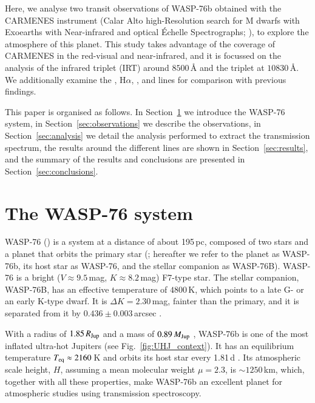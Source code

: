 \documentclass{aa}
\begin{document}
Here, we analyse two transit observations of WASP-76b obtained with the CARMENES instrument (Calar Alto high-Resolution search for M dwarfs with Exoearths with Near-infrared and optical Échelle Spectrographs; \citealt{CARMENES,CARMENES20}), to explore the atmosphere of this planet. This study takes advantage of the coverage of CARMENES in the red-visual and near-infrared, and it is focussed on the analysis of the  infrared triplet (IRT) around $8500$\,{\AA} and the  triplet at $10830$\,{\AA}. We additionally examine the , H$\alpha$, , and  lines for comparison with previous findings.

This paper is organised as follows. In Section~\ref{sec:wasp76} we introduce the WASP-76 system, in Section~\ref{sec:observations} we describe the observations, in Section~\ref{sec:analysis} we detail the analysis performed to extract the transmission spectrum, the results around the different lines are shown in Section~\ref{sec:results}, and the summary of the results and conclusions are presented in Section~\ref{sec:conclusions}.


\section{The WASP-76 system} \label{sec:wasp76}

WASP-76 () is a system at a distance of about 195\,pc, composed of two stars and a planet that orbits the primary star (\citealt{Bohn2020}; hereafter we refer to the planet as WASP-76b, its host star as WASP-76, and the stellar companion as WASP-76B). WASP-76 is a bright ($V \approx9.5$\,mag, $K \approx 8.2$\,mag) F7-type star. The stellar companion, WASP-76B, has an effective temperature of $4800$\,K, which points to a late G- or an early K-type dwarf. It is $\Delta K = 2.30$\,mag, fainter than the primary, and it is separated from it by $0.436\pm0.003$\,arcsec \citep{Southworth2020}. 

With a radius of $1.85\,R_{\rm Jup}$ and a mass of $0.89\,M_{\rm Jup}$ \citep{Ehrenreich2020}, WASP-76b is one of the most inflated ultra-hot Jupiters (see Fig.~\ref{fig:UHJ_context}). 
It has an equilibrium temperature $T_{\rm eq} \approx 2160$\,K and orbits its host star every 1.81\,d \citep{West2016}. 
Its atmospheric scale height, $H$, assuming a mean molecular weight $\mu=2.3$, is $\sim1250$\,km, which, together with all these properties, make WASP-76b an excellent planet for atmospheric studies using transmission spectroscopy. 
\end{document}
